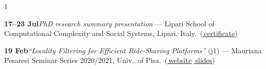 \documentclass[10pt,a4paper,ragged2e,academicons]{altacv}
\newif\ifshortcv
\newcommand{\longonly}[1]{\ifshortcv\else#1\fi}%
\newcommand{\Lsep}{\;\textcolor{body!40}{\textbullet}\;}
\begin{document}
\begin{paracol}{1}
{{\begin{talklist}
  \item \textbf{17--23 Jul}\enspace \textit{PhD research summary presentation} --- Lipari School of Computational Complexity and Social Systems, Lipari, Italy.\ {\footnotesize(\href{https://www.francescotosoni.it/static/complex22.pdf}{\faCertificate\,certificate})}
\end{talklist}

\begin{talklist}
  \item \textbf{19 Feb}\enspace \textit{``Locality Filtering for Efficient Ride-Sharing Platforms''} (j1) --- Mauriana Pesaresi Seminar Series 2020/2021, Univ.~of Pisa.\ {\footnotesize(\href{https://danilonumeroso.github.io/pesaresi-seminar-series/}{\faGlobe\,website} \Lsep \href{https://www.francescotosoni.it/static/slides_20210219.pdf}{\faFilePowerpoint\,slides})}
\end{talklist}
}%
} %

\end{paracol}
\end{document}
